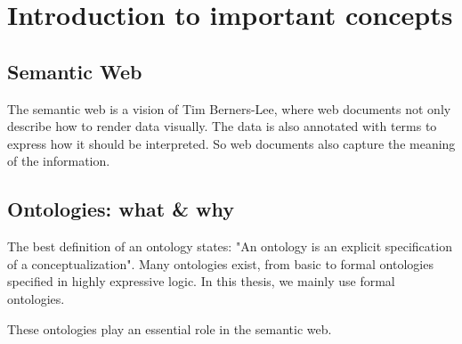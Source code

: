 \section{Introduction to important concepts}
\subsection{Semantic Web}
The semantic web is a vision of Tim Berners-Lee, where web documents not only describe how to render data visually. The data is also annotated with terms to express how it should be interpreted. So web documents also capture the meaning of the information.

\subsection{Ontologies: what \& why}
The best definition of an ontology states: "An ontology is an explicit specification of a conceptualization"\cite{GRUBER1993199}. Many ontologies exist, from basic to formal ontologies specified in highly expressive logic. In this thesis, we mainly use formal ontologies.

These ontologies play an essential role in the semantic web. 